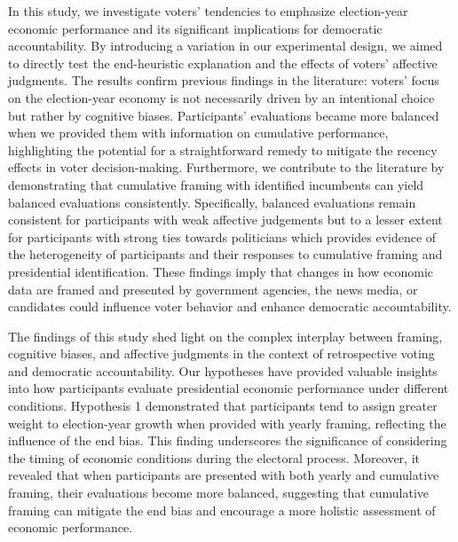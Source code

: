 \documentclass[
]{article}
\begin{document}
In this study, we investigate voters' tendencies to emphasize
election-year economic performance and its significant implications for
democratic accountability. By introducing a variation in our
experimental design, we aimed to directly test the end-heuristic
explanation and the effects of voters' affective judgments. The results
confirm previous findings in the literature: voters' focus on the
election-year economy is not necessarily driven by an intentional choice
but rather by cognitive biases. Participants' evaluations became more
balanced when we provided them with information on cumulative
performance, highlighting the potential for a straightforward remedy to
mitigate the recency effects in voter decision-making. Furthermore, we
contribute to the literature by demonstrating that cumulative framing
with identified incumbents can yield balanced evaluations consistently.
Specifically, balanced evaluations remain consistent for participants
with weak affective judgements but to a lesser extent for participants
with strong ties towards politicians which provides evidence of the
heterogeneity of participants and their responses to cumulative framing
and presidential identification. These findings imply that changes in
how economic data are framed and presented by government agencies, the
news media, or candidates could influence voter behavior and enhance
democratic accountability.

The findings of this study shed light on the complex interplay between
framing, cognitive biases, and affective judgments in the context of
retrospective voting and democratic accountability. Our hypotheses have
provided valuable insights into how participants evaluate presidential
economic performance under different conditions. Hypothesis 1
demonstrated that participants tend to assign greater weight to
election-year growth when provided with yearly framing, reflecting the
influence of the end bias. This finding underscores the significance of
considering the timing of economic conditions during the electoral
process. Moreover, it revealed that when participants are presented with
both yearly and cumulative framing, their evaluations become more
balanced, suggesting that cumulative framing can mitigate the end bias
and encourage a more holistic assessment of economic performance.
\end{document}
